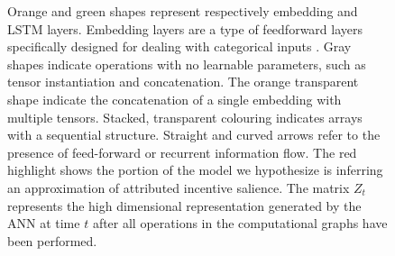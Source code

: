 \begin{figure}[ht]
\begin{center}
\begin{adjustbox}{width=0.7\textwidth}
\begin{tikzpicture}[x=0.75pt,y=0.75pt,yscale=-1,xscale=1]
\end{tikzpicture}

\end{adjustbox}
\end{center}
\caption[\textbf{The procedure for generating latent representations generated by an ANN}]{Orange and green shapes represent respectively embedding and LSTM layers. Embedding layers are a type of feedforward layers specifically designed for dealing with categorical inputs \cite{chollet2015keras}. Gray shapes indicate operations with no learnable parameters, such as tensor instantiation and concatenation. The orange transparent shape indicate the concatenation of a single embedding with multiple tensors. Stacked, transparent colouring indicates arrays with a sequential structure. Straight and curved arrows refer to the presence of feed-forward or recurrent information flow. The red highlight shows the portion of the model we hypothesize is inferring an approximation of attributed incentive salience. The matrix $Z_t$ represents the high dimensional representation generated by the ANN at time $t$ after all operations in the computational graphs have been performed.}
\label{fig: repr_exctracto}
\end{figure}